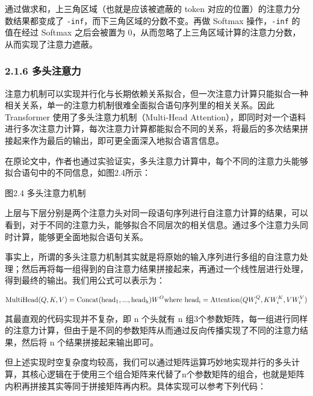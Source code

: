 \documentclass[12pt,a4paper]{book}
\begin{document}
通过做求和，上三角区域（也就是应该被遮蔽的 token
对应的位置）的注意力分数结果都变成了
\texttt{-inf}，而下三角区域的分数不变。再做 Softmax 操作，\texttt{-inf}
的值在经过 Softmax 之后会被置为
0，从而忽略了上三角区域计算的注意力分数，从而实现了注意力遮蔽。

\subsubsection{2.1.6 多头注意力}\label{ux591aux5934ux6ce8ux610fux529b}

注意力机制可以实现并行化与长期依赖关系拟合，但一次注意力计算只能拟合一种相关关系，单一的注意力机制很难全面拟合语句序列里的相关关系。因此
Transformer 使用了多头注意力机制（Multi-Head
Attention），即同时对一个语料进行多次注意力计算，每次注意力计算都能拟合不同的关系，将最后的多次结果拼接起来作为最后的输出，即可更全面深入地拟合语言信息。

在原论文中，作者也通过实验证实，多头注意力计算中，每个不同的注意力头能够拟合语句中的不同信息，如图2.4所示：

图2.4 多头注意力机制

\hspace{0pt}上层与下层分别是两个注意力头对同一段语句序列进行自注意力计算的结果，可以看到，对于不同的注意力头，能够拟合不同层次的相关信息。通过多个注意力头同时计算，能够更全面地拟合语句关系。

事实上，所谓的多头注意力机制其实就是将原始的输入序列进行多组的自注意力处理；然后再将每一组得到的自注意力结果拼接起来，再通过一个线性层进行处理，得到最终的输出。我们用公式可以表示为：

\[
\mathrm{MultiHead}(Q, K, V) = \mathrm{Concat}(\mathrm{head_1}, ...,
\mathrm{head_h})W^O    \\
    \text{where}~\mathrm{head_i} = \mathrm{Attention}(QW^Q_i, KW^K_i, VW^V_i)
\]

其最直观的代码实现并不复杂，即 n 个头就有 n
组3个参数矩阵，每一组进行同样的注意力计算，但由于是不同的参数矩阵从而通过反向传播实现了不同的注意力结果，然后将
n 个结果拼接起来输出即可。

但上述实现时空复杂度均较高，我们可以通过矩阵运算巧妙地实现并行的多头计算，其核心逻辑在于使用三个组合矩阵来代替了n个参数矩阵的组合，也就是矩阵内积再拼接其实等同于拼接矩阵再内积。具体实现可以参考下列代码：
\end{document}
